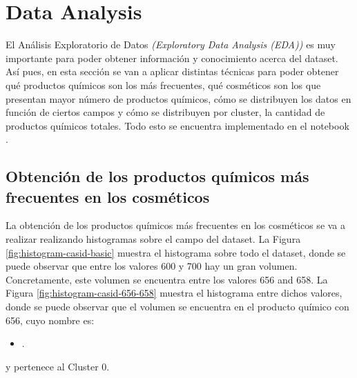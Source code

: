 
\section{Data Analysis}

El Análisis Exploratorio de Datos \textit{(Exploratory Data Analysis (EDA))} \citep{eda} es muy importante para poder obtener información y conocimiento acerca del dataset. Así pues, en esta sección se van a aplicar distintas técnicas para poder obtener qué productos químicos son los más frecuentes, qué cosméticos son los que presentan mayor número de productos químicos, cómo se distribuyen los datos en función de ciertos campos y cómo se distribuyen por cluster, la cantidad de productos químicos totales. Todo esto se encuentra implementado en el notebook  \citep{master}.



\subsection{Obtención de los productos químicos más frecuentes en los cosméticos}
\label{sec:casid-histograms}

La obtención de los productos químicos más frecuentes en los cosméticos se va a realizar realizando histogramas sobre el campo  del dataset. La Figura \ref{fig:histogram-casid-basic} muestra el histograma sobre todo el dataset, donde se puede observar que entre los valores 600 y 700 hay un gran volumen. \\

Concretamente, este volumen se encuentra entre los valores 656 and 658. La Figura \ref{fig:histogram-casid-656-658} muestra el histograma entre dichos valores, donde se puede observar que el volumen se encuentra en el producto químico con  656, cuyo nombre es: 
\begin{itemize}
 \item {}.
\end{itemize}

y pertenece al Cluster 0. 


